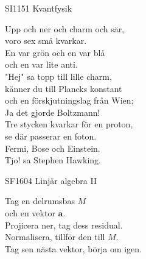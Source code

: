 \documentclass[a6paper,10pt]{article}
\begin{document}
\setlength{\oddsidemargin}{-0.37in}
\noindent
\begin{center}
\footnotesize SI1151 Kvantfysik\\
\end{center}
\begin{lyrics}
Upp och ner och charm och sär, \\
voro sex små kvarkar. \\
En var grön och en var blå \\
och en var lite anti. 
\vspace{5pt} \\
"Hej" sa topp till lille charm, \\
känner du till Plancks konstant \\
och en förskjutningslag från Wien; \\
Ja det gjorde Boltzmann! 
\vspace{5pt} \\
Tre stycken kvarkar för en proton, \\
se där passerar en foton. \\
Fermi, Bose och Einstein. \\
Tjo! sa Stephen Hawking. 
\end{lyrics}
\begin{center}
\footnotesize SF1604 Linjär algebra II\\
\end{center}
\begin{lyrics}
Tag en delrumsbas $M$\\
och en vektor $\boldsymbol{a}$.\\
Projicera ner, tag dess residual.\\
Normalisera, tillför den till $M$.\\
Tag sen nästa vektor, börja om igen.
\end{lyrics}



\setlength{\oddsidemargin}{-0.47in}
\noindent
\end{document}

